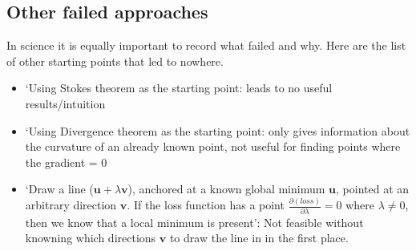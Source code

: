 \documentclass[a4paper, 12pt]{article}
\newcommand{\ve}[1]{\boldsymbol{#1}}
\begin{document}
\begin{appendices}
\subsection{Other failed approaches}
In science it is equally important to record what failed and why. Here are the list of other starting points that led to nowhere.
\begin{itemize}
    \item `Using Stokes theorem as the starting point: leads to no useful results/intuition
    \item `Using Divergence theorem as the starting point: only gives information about the curvature of an already known point, not useful for finding points where the gradient = 0
    \item `Draw a line ($\ve{u}+\lambda\ve{v}$), anchored at a known global minimum $\ve{u}$, pointed at an arbitrary direction $\ve{v}$. If the loss function has a point $\frac{\partial(loss)}{\partial\lambda} =0 $ where $\lambda\neq0$, then we know that a local minimum is present': Not feasible without knowning which directions $\ve{v}$ to draw the line in in the first place. 
\end{itemize}

\end{appendices}
\end{document}
